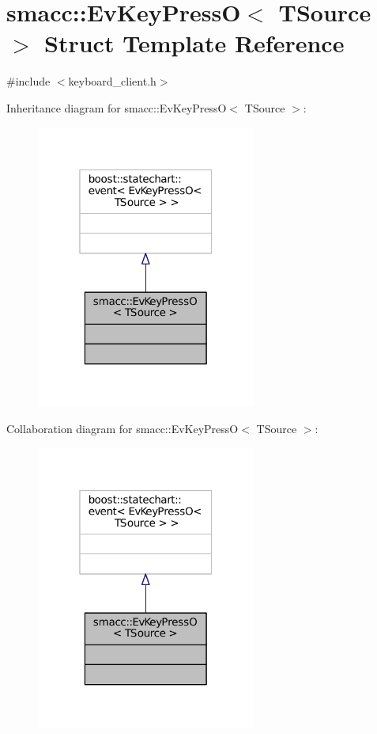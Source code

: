 \hypertarget{structsmacc_1_1EvKeyPressO}{}\section{smacc\+:\+:Ev\+Key\+PressO$<$ T\+Source $>$ Struct Template Reference}
\label{structsmacc_1_1EvKeyPressO}


{\ttfamily \#include $<$keyboard\+\_\+client.\+h$>$}



Inheritance diagram for smacc\+:\+:Ev\+Key\+PressO$<$ T\+Source $>$\+:
\nopagebreak
\begin{figure}[H]
\begin{center}
\leavevmode
\includegraphics[width=205pt]{structsmacc_1_1EvKeyPressO__inherit__graph}
\end{center}
\end{figure}


Collaboration diagram for smacc\+:\+:Ev\+Key\+PressO$<$ T\+Source $>$\+:
\nopagebreak
\begin{figure}[H]
\begin{center}
\leavevmode
\includegraphics[width=205pt]{structsmacc_1_1EvKeyPressO__coll__graph}
\end{center}
\end{figure}



